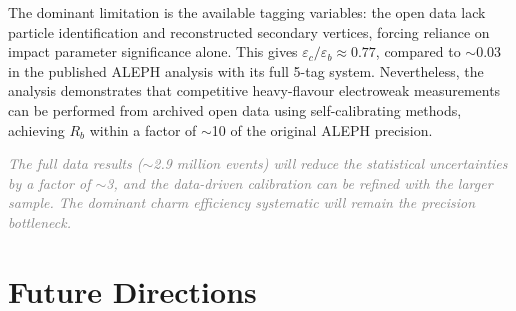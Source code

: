 \documentclass[11pt,a4paper]{article}
\newcommand{\tbd}[1]{\textcolor{gray}{\textit{#1}}}
\begin{document}
The dominant limitation is the available tagging variables:
the open data lack particle identification and reconstructed
secondary vertices, forcing reliance on impact parameter
significance alone.
This gives $\varepsilon_c/\varepsilon_b \approx 0.77$, compared
to $\sim$0.03 in the published ALEPH analysis with its full
5-tag system.
Nevertheless, the analysis demonstrates that competitive
heavy-flavour electroweak measurements can be performed from
archived open data using self-calibrating methods, achieving
$R_b$ within a factor of $\sim$10 of the original ALEPH
precision.

\tbd{The full data results ($\sim$2.9 million events)
will reduce the statistical uncertainties by a factor of
$\sim$3, and the data-driven calibration can be refined with the
larger sample. The dominant charm efficiency systematic will
remain the precision bottleneck.}

\section{Future Directions}
\label{sec:future}
\end{document}
